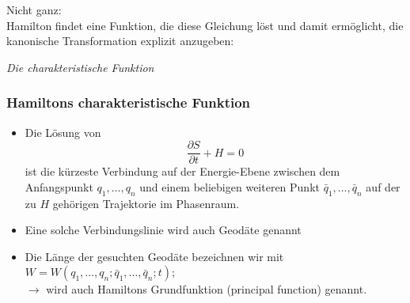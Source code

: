 \begin{frame}
    Nicht ganz: \\
            \vspace{1cm}
    Hamilton findet eine Funktion, die diese Gleichung löst und damit ermöglicht, die kanonische Transformation explizit anzugeben:    
    \begin{center} \emph{Die charakteristische Funktion} \end{center}
\end{frame}


\begin{frame}
	\frametitle{Hamiltons charakteristische Funktion}
	
	\begin{itemize}
		\item Die Lösung von 
		\begin{displaymath}
			\frac{\partial S}{\partial t} + H = 0
		\end{displaymath}
		ist die kürzeste Verbindung auf der Energie-Ebene zwischen dem Anfangspunkt $q_1,\ldots,q_n$ und einem beliebigen weiteren Punkt $\bar{q}_1,\ldots,\bar{q}_n$ auf der zu $H$ gehörigen Trajektorie im Phasenraum.
		
		\item Eine solche Verbindungslinie wird auch Geodäte genannt
		
		\item Die Länge der gesuchten Geodäte bezeichnen wir mit $W=W(q_1,\ldots,q_n;\bar{q}_1,\ldots,\bar{q}_n;t)$;\\ $\rightarrow$ wird auch Hamiltons Grundfunktion (principal function) genannt.
	\end{itemize}	
	
\end{frame}


